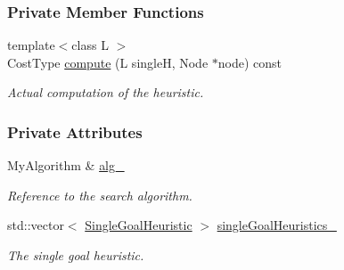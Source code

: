 \subsubsection*{Private Member Functions}
\begin{DoxyCompactItemize}
\item 
{\footnotesize template$<$class L $>$ }\\Cost\+Type \hyperlink{structslb_1_1ext_1_1policy_1_1heuristic_1_1MinMultipleGoalsT_ac07aaa575e2b7713dc67ab67dc84a54b}{compute} (L singleH, Node $\ast$node) const 
\begin{DoxyCompactList}\small\item\em Actual computation of the heuristic. \end{DoxyCompactList}\end{DoxyCompactItemize}
\subsubsection*{Private Attributes}
\begin{DoxyCompactItemize}
\item 
My\+Algorithm \& \hyperlink{structslb_1_1ext_1_1policy_1_1heuristic_1_1MinMultipleGoalsT_abc9bfa56b1be12d3a091c186b6197536}{alg\+\_\+}\hypertarget{structslb_1_1ext_1_1policy_1_1heuristic_1_1MinMultipleGoalsT_abc9bfa56b1be12d3a091c186b6197536}{}\label{structslb_1_1ext_1_1policy_1_1heuristic_1_1MinMultipleGoalsT_abc9bfa56b1be12d3a091c186b6197536}

\begin{DoxyCompactList}\small\item\em Reference to the search algorithm. \end{DoxyCompactList}\item 
std\+::vector$<$ \hyperlink{structslb_1_1ext_1_1policy_1_1heuristic_1_1MinMultipleGoalsT_ae0deabd1bd117ed3fdbb2f0859d0efb6}{Single\+Goal\+Heuristic} $>$ \hyperlink{structslb_1_1ext_1_1policy_1_1heuristic_1_1MinMultipleGoalsT_ac0f9e20c15cf714620bc7f25dbbfa202}{single\+Goal\+Heuristics\+\_\+}\hypertarget{structslb_1_1ext_1_1policy_1_1heuristic_1_1MinMultipleGoalsT_ac0f9e20c15cf714620bc7f25dbbfa202}{}\label{structslb_1_1ext_1_1policy_1_1heuristic_1_1MinMultipleGoalsT_ac0f9e20c15cf714620bc7f25dbbfa202}

\begin{DoxyCompactList}\small\item\em The single goal heuristic. \end{DoxyCompactList}\end{DoxyCompactItemize}


